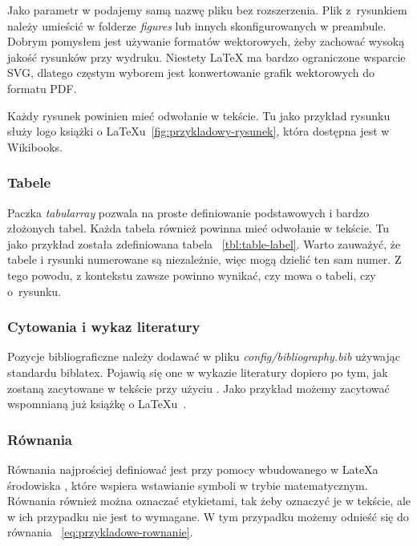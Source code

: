 Jako parametr w  podajemy samą
nazwę pliku bez rozszerzenia. Plik z~rysunkiem należy umieścić
w folderze \emph{figures} lub innych skonfigurowanych w preambule.
Dobrym pomysłem jest używanie formatów wektorowych, żeby zachować wysoką
jakość rysunków przy wydruku. Niestety LaTeX ma bardzo ograniczone
wsparcie SVG, dlatego częstym wyborem jest konwertowanie grafik
wektorowych do formatu PDF.

Każdy rysunek powinien mieć odwołanie w tekście. Tu jako przykład
rysunku służy logo książki o LaTeXu~\ref{fig:przykladowy-rysunek}, która
dostępna jest w Wikibooks.

\subsubsection{Tabele}



Paczka \emph{tabularray} pozwala na proste definiowanie podstawowych
i bardzo złożonych tabel. Każda tabela również powinna mieć odwołanie
w tekście. Tu jako przykład została zdefiniowana tabela
~\ref{tbl:table-label}. Warto zauważyć, że tabele i rysunki
numerowane są niezależnie, więc mogą dzielić ten sam numer. Z tego
powodu, z kontekstu zawsze powinno wynikać, czy mowa o tabeli, czy
o~rysunku.

\subsubsection{Cytowania i wykaz literatury}

Pozycje bibliograficzne należy dodawać w pliku
\emph{config/bibliography.bib} używając standardu biblatex. Pojawią się
one w wykazie literatury dopiero po tym, jak zostaną zacytowane w tekście
przy użyciu . Jako przykład możemy zacytować
wspomnianą już książkę o LaTeXu~\cite{book:latex}.

\subsubsection{Równania}

Równania najprościej definiować jest przy pomocy wbudowanego w LateXa
środowiska , które wspiera wstawianie
symboli w trybie matematycznym. Równania również można oznaczać
etykietami, tak żeby oznaczyć je w tekście, ale w ich przypadku nie jest
to wymagane. W tym przypadku możemy odnieść się do równania
~\ref{eq:przykladowe-rownanie}.

